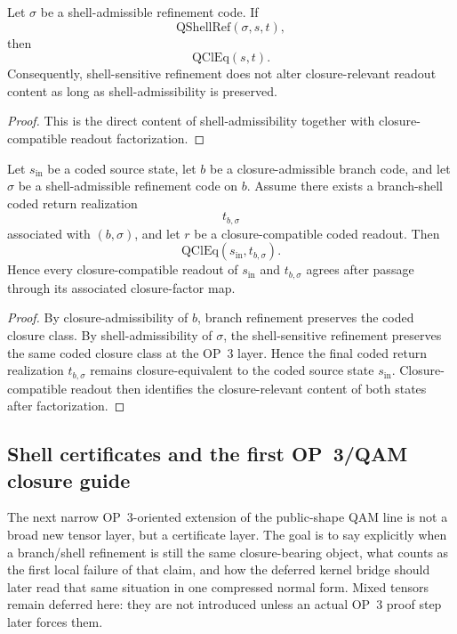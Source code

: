 \begin{proposition}\label{prop:qam-shell-admissibility-principle}
Let $\sigma$ be a shell-admissible refinement code. If
\[
\mathrm{QShellRef}(\sigma,s,t),
\]
then
\[
\mathrm{QClEq}(s,t).
\]
Consequently, shell-sensitive refinement does not alter closure-relevant readout content as long as shell-admissibility is preserved.
\end{proposition}

\begin{proof}
This is the direct content of shell-admissibility together with closure-compatible readout factorization.
\end{proof}

\begin{theorem}\label{thm:qam-branch-shell}
Let $s_{\mathrm{in}}$ be a coded source state, let $b$ be a closure-admissible branch code, and let $\sigma$ be a shell-admissible refinement code on $b$. Assume there exists a branch-shell coded return realization
\[
t_{b,\sigma}
\]
associated with $(b,\sigma)$, and let $r$ be a closure-compatible coded readout. Then
\[
\mathrm{QClEq}(s_{\mathrm{in}},t_{b,\sigma}).
\]
Hence every closure-compatible readout of $s_{\mathrm{in}}$ and $t_{b,\sigma}$ agrees after passage through its associated closure-factor map.
\end{theorem}

\begin{proof}
By closure-admissibility of $b$, branch refinement preserves the coded closure class. By shell-admissibility of $\sigma$, the shell-sensitive refinement preserves the same coded closure class at the OP~3 layer. Hence the final coded return realization $t_{b,\sigma}$ remains closure-equivalent to the coded source state $s_{\mathrm{in}}$. Closure-compatible readout then identifies the closure-relevant content of both states after factorization.
\end{proof}



\subsection*{Shell certificates and the first OP~3/QAM closure guide}
The next narrow OP~3-oriented extension of the public-shape QAM line is not a broad new tensor layer, but a certificate layer. The goal is to say explicitly when a branch/shell refinement is still the same closure-bearing object, what counts as the first local failure of that claim, and how the deferred kernel bridge should later read that same situation in one compressed normal form. Mixed tensors remain deferred here: they are not introduced unless an actual OP~3 proof step later forces them.

